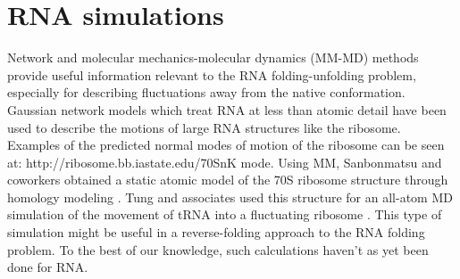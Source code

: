 \section{RNA simulations}
Network and molecular mechanics-molecular dynamics (MM-MD) methods
provide useful information relevant to the RNA folding-unfolding
problem, especially for describing fluctuations away from the native
conformation. Gaussian network models \cite{y_wang2004, bahar1998,
wang2005} which treat RNA at less than atomic detail have been used
to describe the motions of large RNA structures like the ribosome.
Examples of the predicted normal modes of motion of the ribosome can
be seen at: http://ribosome.bb.iastate.edu/70SnK mode. Using MM,
Sanbonmatsu and coworkers obtained a static atomic model of the 70S
ribosome structure through homology modeling \cite{tung2004}. Tung and
associates used this structure for an all-atom MD simulation of the
movement of tRNA into a fluctuating ribosome \cite{sanbonmatsu2005}.
This type of simulation might be useful in a reverse-folding
approach to the RNA folding problem. To the best of our knowledge,
such calculations haven't as yet been done for RNA.

